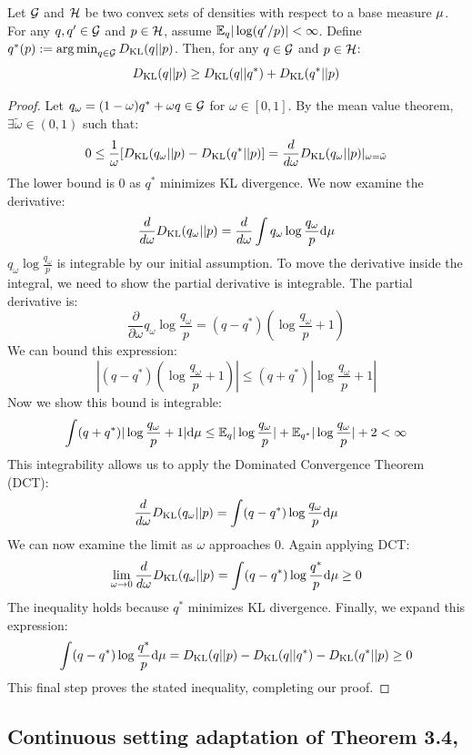 \begin{myLemma}
\label{lemma:pyth}
Let $\mathcal{G}$ and $\mathcal{H}$ be two convex sets of densities with respect to a base measure $\mu$. For any $q,q'\in \mathcal{G}$ and $p\in \mathcal{H}$, assume $\mathbb{E}_{q}|\log(q'/p)| < \infty$. Define $q^*(p) := \operatorname*{arg\,min}_{q\in \mathcal{G}}D_{\mathrm{KL}}(q||p)$. Then, for any $q \in \mathcal{G}$ and $p \in \mathcal{H}$:
$$D_{\mathrm{KL}}(q||p) \ge D_{\mathrm{KL}}(q||q^*) + D_{\mathrm{KL}}(q^*||p)$$
\end{myLemma}
\begin{proof}
Let $q_{\omega} = (1-\omega)q^* + \omega q \in \mathcal{G}$ for $\omega \in [0,1]$. By the mean value theorem, $\exists \tilde{\omega} \in (0,1)$ such that:
$$0 \le \frac{1}{\omega} [D_{\mathrm{KL}}(q_{\omega}||p) - D_{\mathrm{KL}}(q^*||p)] = \frac{d}{d\omega} D_{\mathrm{KL}}(q_{\omega}||p) |_{\omega = \tilde{\omega}}$$
The lower bound is 0 as $q^*$ minimizes KL divergence. We now examine the derivative:
$$\frac{d}{d\omega} D_{\mathrm{KL}}(q_{\omega}||p) = \frac{d}{d\omega} \int q_{\omega} \log \frac{q_{\omega}}{p}\mathrm{d}\mu$$
$q_{\omega} \log \frac{q_{\omega}}{p}$ is integrable by our initial assumption. To move the derivative inside the integral, we need to show the partial derivative is integrable. The partial derivative is:
$$\frac{\partial}{\partial \omega} q_{\omega} \log \frac{q_{\omega}}{p} = (q-q^*)(\log \frac{q_{\omega}}{p}+1)$$
We can bound this expression:
$$|(q-q^*)(\log \frac{q_{\omega}}{p}+1)| \le (q+q^*)|\log \frac{q_{\omega}}{p}+1|$$
Now we show this bound is integrable:
$$\int (q+q^*)|\log \frac{q_{\omega}}{p}+1|\mathrm{d}\mu \le \mathbb{E}_{q} |\log \frac{q_{\omega}}{p}| + \mathbb{E}_{q^*} |\log \frac{q_{\omega}}{p}| + 2 < \infty$$
This integrability allows us to apply the Dominated Convergence Theorem (DCT):
$$\frac{d}{d\omega} D_{\mathrm{KL}}(q_{\omega}||p) = \int (q-q^*)\log \frac{q_{\omega}}{p}\mathrm{d}\mu$$
We can now examine the limit as $\omega$ approaches 0. Again applying DCT:
$$\lim_{\omega \to 0}\frac{d}{d\omega} D_{\mathrm{KL}}(q_{\omega}||p) = \int (q-q^*)\log \frac{q^*}{p}\mathrm{d}\mu \ge 0$$
The inequality holds because $q^*$ minimizes KL divergence. Finally, we expand this expression:
$$\int (q-q^*)\log \frac{q^*}{p}\mathrm{d}\mu = D_{\mathrm{KL}}(q||p) - D_{\mathrm{KL}}(q||q^*) - D_{\mathrm{KL}}(q^*||p) \ge 0$$
This final step proves the stated inequality, completing our proof.
\end{proof}

\subsection{Continuous setting adaptation of Theorem 3.4, \texorpdfstring{\citet{csiszar2004information}}{}}

